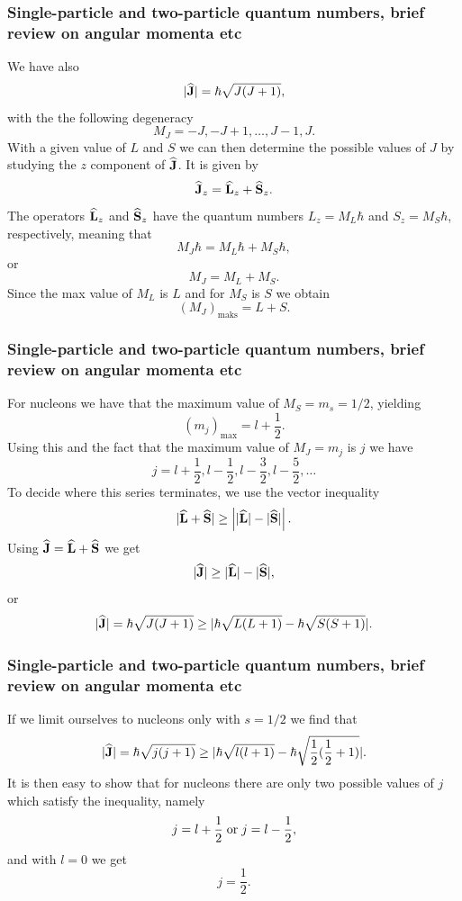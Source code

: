 \documentclass[compress]{beamer}
\newcommand{\OP}[1]{{\bf\widehat{#1}}}
\begin{document}
\frame
{
\frametitle{Single-particle and two-particle quantum numbers, brief review on angular momenta etc}

\begin{small}
{\scriptsize
We have also
\[
   |\OP{J}|=\hbar\sqrt{J(J+1)},
\]
with the the following degeneracy
\[
   M_J=-J, -J+1, \dots, J-1, J.
\]
With a given value of  $L$ and $S$ we can then determine the possible values of 
 $J$ by studying the $z$ component of  $\OP{J}$. 
It is given by
\[
\OP{J}_z=\OP{L}_z+\OP{S}_z.
\]
The operators $\OP{L}_z$ and $\OP{S}_z$ have the quantum numbers
$L_z=M_L\hbar$ and $S_z=M_S\hbar$, respectively, meaning that
\[
   M_J\hbar=M_L\hbar +M_S\hbar,
\]
or
\[
   M_J=M_L +M_S.
\]
Since the max value of  $M_L$ is $L$ and for  $M_S$ is $S$
we obtain
\[
   (M_J)_{\mathrm{maks}}=L+S.
\]
}
\end{small}
}

\frame
{
\frametitle{Single-particle and two-particle quantum numbers, brief review on angular momenta etc}

\begin{small}
{\scriptsize
For nucleons we have that the maximum value of $M_S=m_s=1/2$, yielding
\[
   (m_j)_{\mathrm{max}}=l+\frac{1}{2}.
\]
Using this and the fact that the maximum value of  $M_J=m_j$ is $j$ we have
\[
   j=l+\frac{1}{2}, l-\frac{1}{2}, l-\frac{3}{2}, l-\frac{5}{2}, \dots 
\]
To decide where this series terminates, we use the vector inequality
\[
   |\OP{L}+\OP{S}| \ge \left| |\OP{L}|-|\OP{S}|\right|.
\]
Using $\OP{J}=\OP{L}+\OP{S}$ we get 
\[
   |\OP{J}| \ge |\OP{L}|-|\OP{S}|,
\]
or
\[
   |\OP{J}|=\hbar\sqrt{J(J+1)}\ge |\hbar\sqrt{L(L+1)}-
   \hbar\sqrt{S(S+1)}|.
\]

}
\end{small}
}

\frame
{
\frametitle{Single-particle and two-particle quantum numbers, brief review on angular momenta etc}

\begin{small}
{\scriptsize
If we limit ourselves to nucleons only with $s=1/2$
we find that
\[
   |\OP{J}|=\hbar\sqrt{j(j+1)}\ge |\hbar\sqrt{l(l+1)}-
   \hbar\sqrt{\frac{1}{2}(\frac{1}{2}+1)}|.
\]
It is then easy to show that for nucleons there are only two possible values of
$j$ which satisfy the inequality, namely
\[
   j=l+\frac{1}{2}\hspace{0.1cm} \mathrm{or} \hspace{0.1cm}j=l-\frac{1}{2},
\]
and with $l=0$ we get 
\[
   j=\frac{1}{2}.
\]
}
\end{small}
}
\end{document}
